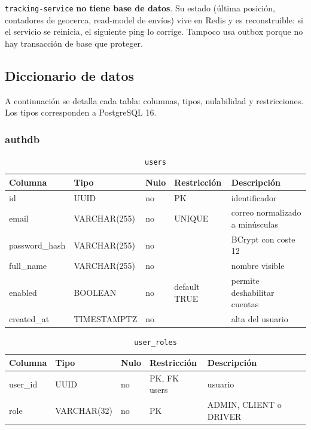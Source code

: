 \documentclass[conference]{IEEEtran}
\newcommand{\pkg}[1]{\texttt{#1}}
\begin{document}
\begin{alerta}[¿Y tracking?]
\pkg{tracking-service} \textbf{no tiene base de datos}. Su estado (última posición, contadores de
geocerca, read-model de envíos) vive en Redis y es reconstruible: si el servicio se reinicia, el
siguiente ping lo corrige. Tampoco usa outbox porque no hay transacción de base que proteger.
\end{alerta}

\subsection{Diccionario de datos}

A continuación se detalla cada tabla: columnas, tipos, nulabilidad y restricciones. Los tipos
corresponden a PostgreSQL 16.

\subsubsection{authdb}

\begin{table}[!t]
\centering
\caption{\pkg{users}}

\begin{tabular}{@{}L{3.4cm}L{3.2cm}L{1.2cm}L{3.6cm}L{3.4cm}@{}}
\toprule
\textbf{Columna} & \textbf{Tipo} & \textbf{Nulo} & \textbf{Restricción} & \textbf{Descripción}\\
\midrule
id & UUID & no & PK & identificador\\
email & VARCHAR(255) & no & UNIQUE & correo normalizado a minúsculas\\
password\_hash & VARCHAR(255) & no & & BCrypt con coste 12\\
full\_name & VARCHAR(255) & no & & nombre visible\\
enabled & BOOLEAN & no & default TRUE & permite deshabilitar cuentas\\
created\_at & TIMESTAMPTZ & no & & alta del usuario\\
\bottomrule
\end{tabular}
\end{table}

\begin{table}[!t]
\centering
\caption{\pkg{user\_roles}}

\begin{tabular}{@{}L{3.4cm}L{3.2cm}L{1.2cm}L{3.6cm}L{3.4cm}@{}}
\toprule
\textbf{Columna} & \textbf{Tipo} & \textbf{Nulo} & \textbf{Restricción} & \textbf{Descripción}\\
\midrule
user\_id & UUID & no & PK, FK users & usuario\\
role & VARCHAR(32) & no & PK & ADMIN, CLIENT o DRIVER\\
\bottomrule
\end{tabular}
\end{table}
\end{document}
